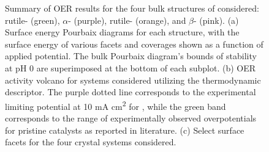 \begin{figure}
\centering
{}
\caption{\label{fig:oer_volcano}
Summary of OER results for the four bulk structures of \IrOx considered: rutile- (green), $\alpha$- (purple), rutile- (orange), and $\beta$- (pink).
%
(a) Surface energy Pourbaix diagrams for each structure, with the surface energy of various facets and coverages shown as a function of applied potential.
The bulk Pourbaix diagram's bounds of stability at pH 0 are superimposed at the bottom of each subplot.
%
(b) OER activity volcano for \IrOx systems considered utilizing the \DGOmOH thermodynamic descriptor.
The purple dotted line corresponds to the experimental limiting potential at 10 mA cm\textsuperscript{2} for  \cite{Seitz2016},
while the green band corresponds to the range of experimentally observed overpotentials for pristine  catalysts as reported in literature.  %
%
(c) Select surface facets for the four \IrOx crystal systems considered.
%
}
\end{figure}

